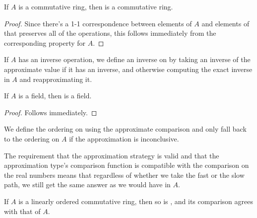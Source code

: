 \begin{lemma}
  \label{thm:filteredRing}
  \leanok
  If $A$ is a commutative ring, then  is a commutative
  ring.
\end{lemma}

\begin{proof}
  \leanok
  Since there's a 1-1 correspondence between elements of $A$ and elements of
   that preserves all of the operations, this follows
  immediately from the corresponding property for $A$.
\end{proof}

\begin{definition}
  \label{def:filteredInv}
  \leanok
  If $A$ has an inverse operation, we define an inverse on  by taking an inverse of the approximate value if it has an inverse, and
  otherwise computing the exact inverse in $A$ and reapproximating it.
\end{definition}

\begin{lemma}
  \label{thm:filteredField}
  \leanok
  If $A$ is a field, then  is a field.
\end{lemma}

\begin{proof}
  \leanok
  Follows immediately.
\end{proof}

\begin{definition}
  \label{def:filteredCompare}
  \leanok
  We define the ordering on  using the approximate
  comparison and only fall back to the ordering on $A$ if the approximation is
  inconclusive.

  The requirement that the approximation strategy is valid and that the
  approximation type's comparison function is compatible with the comparison on
  the real numbers means that regardless of whether we take the fast or the slow
  path, we still get the same answer as we would have in $A$.
\end{definition}

\begin{lemma}
  \label{thm:filteredOrdered}
  \leanok
  If $A$ is a linearly ordered commutative ring, then so is , and its comparison agrees with that of $A$.
\end{lemma}

